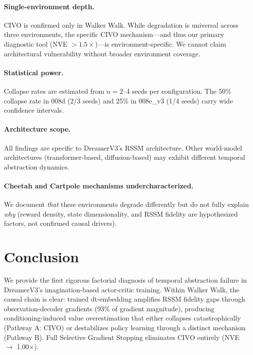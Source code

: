\documentclass[10pt,letterpaper]{article}
\begin{document}
\paragraph{Single-environment depth.} CIVO is confirmed only in Walker Walk. While degradation is universal across three environments, the specific CIVO mechanism---and thus our primary diagnostic tool (NVE $> 1.5\times$)---is environment-specific. We cannot claim architectural vulnerability without broader environment coverage.

\paragraph{Statistical power.} Collapse rates are estimated from $n = 2$--4 seeds per configuration. The 50\% collapse rate in 008d (2/3 seeds) and 25\% in 008e\_v3 (1/4 seeds) carry wide confidence intervals.

\paragraph{Architecture scope.} All findings are specific to DreamerV3's RSSM architecture. Other world-model architectures (transformer-based, diffusion-based) may exhibit different temporal abstraction dynamics.

\paragraph{Cheetah and Cartpole mechanisms undercharacterized.} We document \emph{that} these environments degrade differently but do not fully explain \emph{why} (reward density, state dimensionality, and RSSM fidelity are hypothesized factors, not confirmed causal drivers).

\section{Conclusion}

We provide the first rigorous factorial diagnosis of temporal abstraction failure in DreamerV3's imagination-based actor-critic training. Within Walker Walk, the causal chain is clear: trained dt-embedding amplifies RSSM fidelity gaps through observation-decoder gradients (93\% of gradient magnitude), producing conditioning-induced value overestimation that either collapses catastrophically (Pathway A: CIVO) or destabilizes policy learning through a distinct mechanism (Pathway B). Full Selective Gradient Stopping eliminates CIVO entirely (NVE $\rightarrow$ 1.00$\times$).
\end{document}
